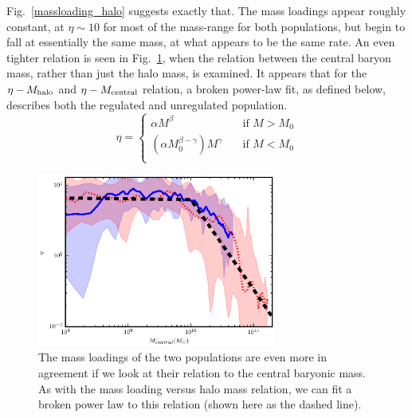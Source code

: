 Fig.~\ref{massloading_halo} suggests exactly that.  The mass loadings appear
roughly constant, at $\eta\sim10$ for most of the mass-range for both
populations, but begin to fall at essentially the same mass, at what appears to
be the same rate.  An even tighter relation is seen in
Fig.~\ref{massloading_central}, when the relation between the central baryon
mass, rather than just the halo mass, is examined. It appears that for the
$\eta-M_{\rm halo}$ and $\eta-M_{\rm central}$ relation, a broken power-law fit, as
defined below, describes both the regulated and unregulated population.
\begin{equation}
    \eta = 
    \begin{cases}
        \alpha M^\beta  & \quad \text{if } M > M_0 \\
        (\alpha M_0^{\beta-\gamma}) M^\gamma & \quad \text{if } M < M_0 \\
    \end{cases}
    \label{outflow_scaling}
\end{equation}
\begin{figure}
    \includegraphics[width=0.7\textwidth]{figures3/massloading_central.eps}
    \caption[Mass loadings as a function of disc mass]{The mass loadings of the two populations are even more in agreement
    if we look at their relation to the central baryonic mass.  As with the mass
    loading versus halo mass relation, we can fit a broken power law to this relation
    (shown here as the dashed line).}
    \label{massloading_central}
\end{figure}
